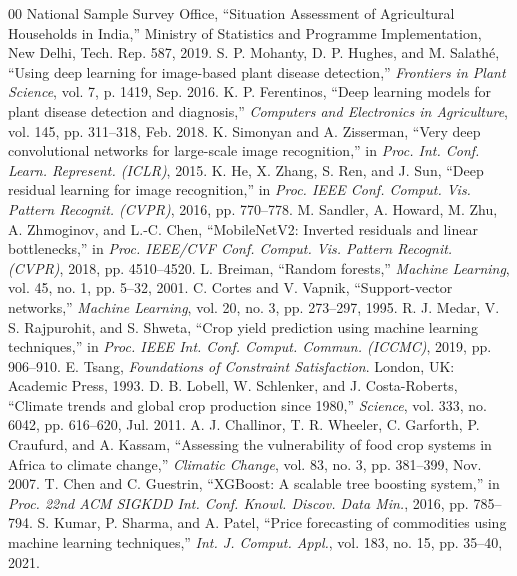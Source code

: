 \documentclass[conference]{IEEEtran}
\begin{document}
\balance

\begin{thebibliography}{00}
 National Sample Survey Office, ``Situation Assessment of Agricultural Households in India,'' Ministry of Statistics and Programme Implementation, New Delhi, Tech. Rep. 587, 2019.
 S. P. Mohanty, D. P. Hughes, and M. Salath\'e, ``Using deep learning for image-based plant disease detection,'' \textit{Frontiers in Plant Science}, vol. 7, p. 1419, Sep. 2016.
 K. P. Ferentinos, ``Deep learning models for plant disease detection and diagnosis,'' \textit{Computers and Electronics in Agriculture}, vol. 145, pp. 311--318, Feb. 2018.
 K. Simonyan and A. Zisserman, ``Very deep convolutional networks for large-scale image recognition,'' in \textit{Proc. Int. Conf. Learn. Represent. (ICLR)}, 2015.
 K. He, X. Zhang, S. Ren, and J. Sun, ``Deep residual learning for image recognition,'' in \textit{Proc. IEEE Conf. Comput. Vis. Pattern Recognit. (CVPR)}, 2016, pp. 770--778.
 M. Sandler, A. Howard, M. Zhu, A. Zhmoginov, and L.-C. Chen, ``MobileNetV2: Inverted residuals and linear bottlenecks,'' in \textit{Proc. IEEE/CVF Conf. Comput. Vis. Pattern Recognit. (CVPR)}, 2018, pp. 4510--4520.
 L. Breiman, ``Random forests,'' \textit{Machine Learning}, vol. 45, no. 1, pp. 5--32, 2001.
 C. Cortes and V. Vapnik, ``Support-vector networks,'' \textit{Machine Learning}, vol. 20, no. 3, pp. 273--297, 1995.
 R. J. Medar, V. S. Rajpurohit, and S. Shweta, ``Crop yield prediction using machine learning techniques,'' in \textit{Proc. IEEE Int. Conf. Comput. Commun. (ICCMC)}, 2019, pp. 906--910.
 E. Tsang, \textit{Foundations of Constraint Satisfaction}. London, UK: Academic Press, 1993.
 D. B. Lobell, W. Schlenker, and J. Costa-Roberts, ``Climate trends and global crop production since 1980,'' \textit{Science}, vol. 333, no. 6042, pp. 616--620, Jul. 2011.
 A. J. Challinor, T. R. Wheeler, C. Garforth, P. Craufurd, and A. Kassam, ``Assessing the vulnerability of food crop systems in Africa to climate change,'' \textit{Climatic Change}, vol. 83, no. 3, pp. 381--399, Nov. 2007.
 T. Chen and C. Guestrin, ``XGBoost: A scalable tree boosting system,'' in \textit{Proc. 22nd ACM SIGKDD Int. Conf. Knowl. Discov. Data Min.}, 2016, pp. 785--794.
 S. Kumar, P. Sharma, and A. Patel, ``Price forecasting of commodities using machine learning techniques,'' \textit{Int. J. Comput. Appl.}, vol. 183, no. 15, pp. 35--40, 2021.

\end{thebibliography}
\end{document}
